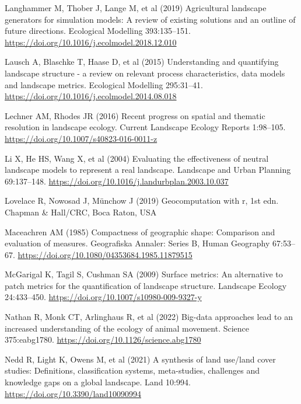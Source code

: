 \documentclass[
  10pt,
  a4paperpaper,
]{article}
\newlength{\cslhangindent}
\newenvironment{CSLReferences}[2] %
 {\begin{list}{}{%
  \setlength{\itemindent}{0pt}
  \setlength{\leftmargin}{0pt}
  \setlength{\parsep}{0pt}
  \ifodd #1
   \setlength{\leftmargin}{\cslhangindent}
   \setlength{\itemindent}{-1\cslhangindent}
  \fi
  \setlength{\itemsep}{#2\baselineskip}}}
 {\end{list}}
\begin{document}
\begin{CSLReferences}{1}{1}
Langhammer M, Thober J, Lange M, et al (2019) Agricultural landscape
generators for simulation models: A review of existing solutions and an
outline of future directions. Ecological Modelling 393:135--151.
\url{https://doi.org/10.1016/j.ecolmodel.2018.12.010}

Lausch A, Blaschke T, Haase D, et al (2015) Understanding and
quantifying landscape structure - a review on relevant process
characteristics, data models and landscape metrics. Ecological Modelling
295:31--41. \url{https://doi.org/10.1016/j.ecolmodel.2014.08.018}

Lechner AM, Rhodes JR (2016) Recent progress on spatial and thematic
resolution in landscape ecology. Current Landscape Ecology Reports
1:98--105. \url{https://doi.org/10.1007/s40823-016-0011-z}

Li X, He HS, Wang X, et al (2004) Evaluating the effectiveness of
neutral landscape models to represent a real landscape. Landscape and
Urban Planning 69:137--148.
\url{https://doi.org/10.1016/j.landurbplan.2003.10.037}

Lovelace R, Nowosad J, Münchow J (2019) Geocomputation with r, 1st edn.
Chapman \& Hall/CRC, Boca Raton, USA

Maceachren AM (1985) Compactness of geographic shape: Comparison and
evaluation of measures. Geografiska Annaler: Series B, Human Geography
67:53--67. \url{https://doi.org/10.1080/04353684.1985.11879515}

McGarigal K, Tagil S, Cushman SA (2009) Surface metrics: An alternative
to patch metrics for the quantification of landscape structure.
Landscape Ecology 24:433--450.
\url{https://doi.org/10.1007/s10980-009-9327-y}

Nathan R, Monk CT, Arlinghaus R, et al (2022) Big-data approaches lead
to an increased understanding of the ecology of animal movement. Science
375:eabg1780. \url{https://doi.org/10.1126/science.abg1780}

Nedd R, Light K, Owens M, et al (2021) A synthesis of land use/land
cover studies: Definitions, classification systems, meta-studies,
challenges and knowledge gaps on a global landscape. Land 10:994.
\url{https://doi.org/10.3390/land10090994}


\end{CSLReferences}
\end{document}
